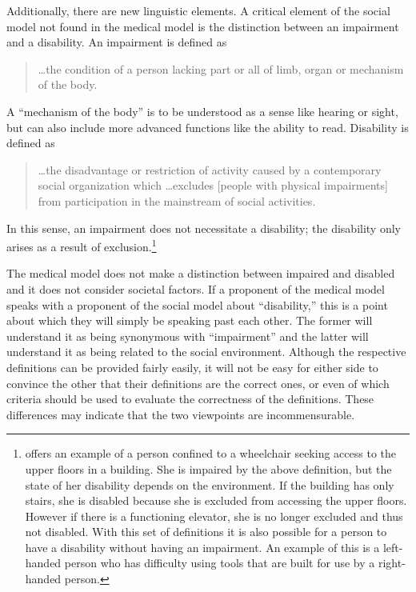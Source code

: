 \documentclass[a4paper]{article}
\begin{document}
Additionally, there are new linguistic elements. A critical element of the
social model not found in the medical model is the distinction between an
impairment and a disability. An impairment is defined as 
%
\begin{quote}
    \ldots the condition of a person lacking part or all of limb, organ or
    mechanism of the body. \citep{winter2003development} 
\end{quote}
%
A ``mechanism of the body'' is to be understood as a sense like hearing or
sight, but can also include more advanced functions like the ability to read.
Disability is defined as 
%
\begin{quote}
    \ldots the disadvantage or restriction of activity caused by a
    contemporary social organization which \ldots excludes [people with
    physical impairments] from participation in the mainstream of social
    activities. \citep{winter2003development}
\end{quote}
%
In this sense, an impairment does not necessitate a disability; the disability
only arises as a result of exclusion.\footnote{\cite{winter2003development}
offers an example of a person confined to a wheelchair seeking access to the
upper floors in a building. She is impaired by the above definition, but the
state of her disability depends on the environment. If the building has only
stairs, she is disabled because she is excluded from accessing the upper
floors. However if there is a functioning elevator, she is no longer excluded
and thus not disabled. With this set of definitions it is also possible for a
person to have a disability without having an impairment. An example of this
is a left-handed person who has difficulty using tools that are built for use
by a right-handed person.}

The medical model does not make a distinction between impaired and disabled
and it does not consider societal factors. If a proponent of the medical model
speaks with a proponent of the social model about ``disability,'' this is a
point about which they will simply be speaking past each other. The former
will understand it as being synonymous with ``impairment'' and the latter will
understand it as being related to the social environment. Although the
respective definitions can be provided fairly easily, it will not be easy for
either side to convince the other that their definitions are the correct ones,
or even of which criteria should be used to evaluate the correctness of the
definitions. These differences may indicate that the two viewpoints are
incommensurable.
\end{document}
